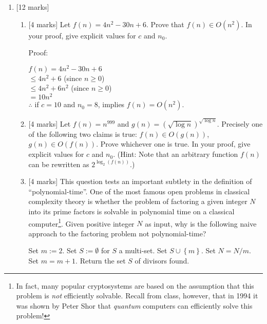 \documentclass{article}
\newcommand{\set}[1]{{\left\{#1\right\}}}    %
\begin{document}
\begin{enumerate}
    \item {[12 marks]} \begin{enumerate}
        \item {[4 marks]} Let $f(n)=4n^2-30n+6$. Prove that $f(n)\in O(n^2)$. In your proof, give explicit values for $c$ and $n_0$.

            Proof:

            $f(n)=4n^2-30n+6$ \\
            $\leq 4n^2+6$ (since $n \geq 0$) \\
            $\leq 4n^2+6n^2$ (since $n \geq 0$)\\
            $= 10n^2$\\
            $\therefore$ if $c = 10$ and $n_0=8$, implies $f(n)=O(n^2)$.

        \item {[4 marks]} Let $f(n)=n^{999}$ and $g(n)=(\sqrt{\log n})^{\sqrt{\log n}}$. Precisely one of the following two claims is true: $f(n)\in O(g(n))$,  $g(n)\in O(f(n))$. Prove whichever one is true. In your proof, give explicit values for $c$ and $n_0$. (Hint: Note that an arbitrary function $f(n)$ can be rewritten as $2^{\log_2(f(n))}$.)


        \item {[4 marks]} This question tests an important subtlety in the definition of ``polynomial-time''.
             One of the most famous open problems in classical complexity theory is whether the problem of factoring a given integer $N$ into its prime factors is solvable in polynomial time on a classical computer\footnote{In fact, many popular cryptosystems are based on the assumption that this problem is \emph{not} efficiently solvable. Recall from class, however, that in 1994 it was shown by Peter Shor that \emph{quantum} computers can efficiently solve this problem!}. Given positive integer $N$ as input, why is the following naive approach to the factoring problem not polynomial-time?
                \begin{algorithmic}[1]
            \State Set $m := 2$.
            \State Set $S := \emptyset$ for $S$ a multi-set.
                    \State Set $S\cup \set{m}$.
                    \State Set $N=N/m$.
                \Else
                    \State Set $m=m+1$.
                \EndIf
            \EndWhile
            \State Return the set $S$ of divisors found.
\end{algorithmic}


\end{enumerate}
\end{enumerate}
\end{document}
